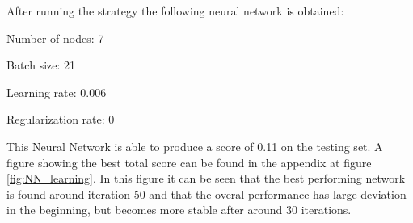 After running the strategy the following neural network is obtained:
\begin{description}
	\item Number of nodes: 7  
	\item Batch size: 21
	\item Learning rate: 0.006
	\item Regularization rate: 0
\end{description}
This Neural Network is able to produce a score of 0.11 on the testing set. A figure showing the best total score can be found in the appendix at figure \ref{fig:NN_learning}. In this figure it can be seen that the best performing network is found around iteration 50 and that the overal performance has large deviation in the beginning, but becomes more stable after around 30 iterations.
